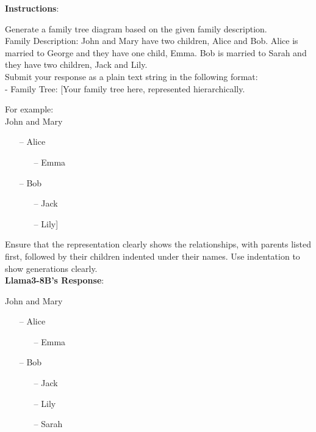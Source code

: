 \begin{tcolorbox}[breakable,boxrule=0.5pt,sharp corners,fontupper=\small,
colback=red!10, colframe=red!50!black, title={Failure: Incorrect Family Tree Diagram}]
\textbf{Instructions}: 

Generate a family tree diagram based on the given family description.\\

Family Description: John and Mary have two children, Alice and Bob. Alice is married to George and they have one child, Emma. Bob is married to Sarah and they have two children, Jack and Lily.\\

Submit your response as a plain text string in the following format:\\
- Family Tree: [Your family tree here, represented hierarchically.

For example:\\
John and Mary
\begin{itemize}
\item[--]Alice
\begin{itemize}
\item[--]Emma
\end{itemize}
\item[--]Bob
\begin{itemize}
\item[--]Jack
\item[--]Lily]
\end{itemize}
\end{itemize}

Ensure that the representation clearly shows the relationships, with parents listed first, followed by their children indented under their names. Use indentation to show generations clearly.\\

\textbf{Llama3-8B's Response}:

John and Mary
\begin{itemize}
\item[--]Alice
\begin{itemize}
\item[--]Emma
\end{itemize}
\item[--]Bob
\begin{itemize}
\item[--]Jack
\item[--]Lily
\item[--]Sarah
\end{itemize}
\end{itemize}
\end{tcolorbox}

